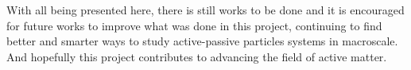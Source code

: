 With all being presented here, there is still works to be done and it is 
encouraged for future works to improve what was done in this project, continuing 
to find better and smarter ways to study active-passive particles systems in macroscale. 
And hopefully this project contributes to advancing the field of active matter.



